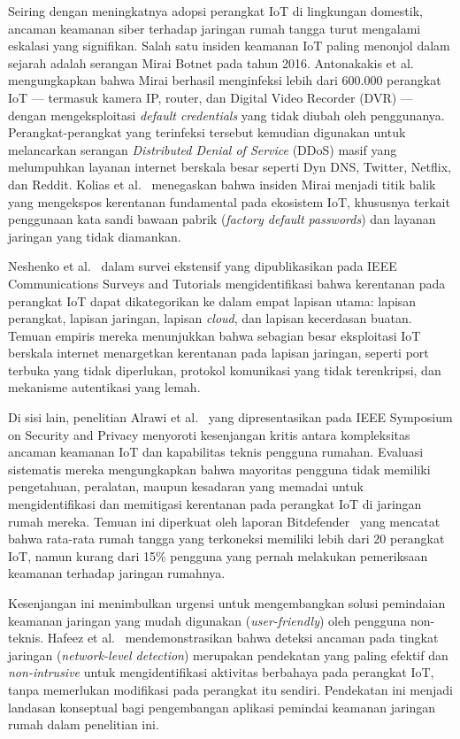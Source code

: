 \documentclass[conference]{IEEEtran}
\begin{document}
Seiring dengan meningkatnya adopsi perangkat IoT di lingkungan domestik, ancaman keamanan siber terhadap jaringan rumah tangga turut mengalami eskalasi yang signifikan. Salah satu insiden keamanan IoT paling menonjol dalam sejarah adalah serangan Mirai Botnet pada tahun 2016. Antonakakis et al.\ \cite{antonakakis2017} mengungkapkan bahwa Mirai berhasil menginfeksi lebih dari 600.000 perangkat IoT --- termasuk kamera IP, router, dan Digital Video Recorder (DVR) --- dengan mengeksploitasi \textit{default credentials} yang tidak diubah oleh penggunanya. Perangkat-perangkat yang terinfeksi tersebut kemudian digunakan untuk melancarkan serangan \textit{Distributed Denial of Service} (DDoS) masif yang melumpuhkan layanan internet berskala besar seperti Dyn DNS, Twitter, Netflix, dan Reddit. Kolias et al.\ \cite{kolias2017} menegaskan bahwa insiden Mirai menjadi titik balik yang mengekspos kerentanan fundamental pada ekosistem IoT, khususnya terkait penggunaan kata sandi bawaan pabrik (\textit{factory default passwords}) dan layanan jaringan yang tidak diamankan.

Neshenko et al.\ \cite{neshenko2019} dalam survei ekstensif yang dipublikasikan pada IEEE Communications Surveys and Tutorials mengidentifikasi bahwa kerentanan pada perangkat IoT dapat dikategorikan ke dalam empat lapisan utama: lapisan perangkat, lapisan jaringan, lapisan \textit{cloud}, dan lapisan kecerdasan buatan. Temuan empiris mereka menunjukkan bahwa sebagian besar eksploitasi IoT berskala internet menargetkan kerentanan pada lapisan jaringan, seperti port terbuka yang tidak diperlukan, protokol komunikasi yang tidak terenkripsi, dan mekanisme autentikasi yang lemah.

Di sisi lain, penelitian Alrawi et al.\ \cite{alrawi2019} yang dipresentasikan pada IEEE Symposium on Security and Privacy menyoroti kesenjangan kritis antara kompleksitas ancaman keamanan IoT dan kapabilitas teknis pengguna rumahan. Evaluasi sistematis mereka mengungkapkan bahwa mayoritas pengguna tidak memiliki pengetahuan, peralatan, maupun kesadaran yang memadai untuk mengidentifikasi dan memitigasi kerentanan pada perangkat IoT di jaringan rumah mereka. Temuan ini diperkuat oleh laporan Bitdefender\ \cite{bitdefender2024} yang mencatat bahwa rata-rata rumah tangga yang terkoneksi memiliki lebih dari 20 perangkat IoT, namun kurang dari 15\% pengguna yang pernah melakukan pemeriksaan keamanan terhadap jaringan rumahnya.

Kesenjangan ini menimbulkan urgensi untuk mengembangkan solusi pemindaian keamanan jaringan yang mudah digunakan (\textit{user-friendly}) oleh pengguna non-teknis. Hafeez et al.\ \cite{hafeez2020} mendemonstrasikan bahwa deteksi ancaman pada tingkat jaringan (\textit{network-level detection}) merupakan pendekatan yang paling efektif dan \textit{non-intrusive} untuk mengidentifikasi aktivitas berbahaya pada perangkat IoT, tanpa memerlukan modifikasi pada perangkat itu sendiri. Pendekatan ini menjadi landasan konseptual bagi pengembangan aplikasi pemindai keamanan jaringan rumah dalam penelitian ini.
\end{document}
